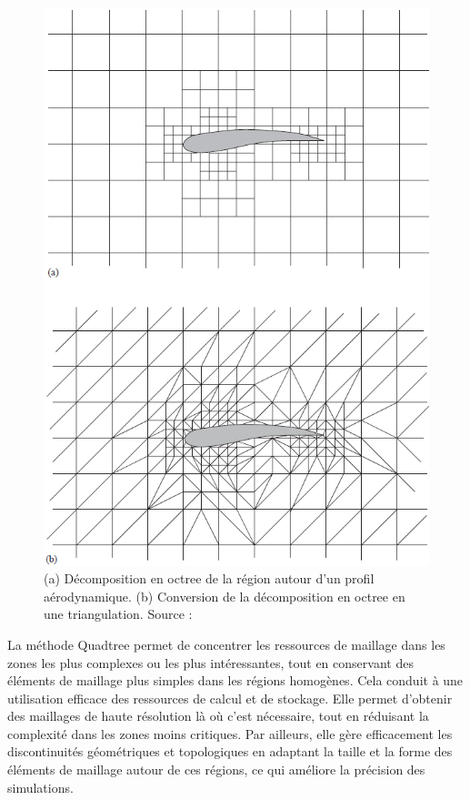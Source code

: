\begin{figure}[!h]
    \centering
    \includegraphics[scale=0.6]{images/octree decomposition.png}
    \caption{(a) Décomposition en octree de la région autour d'un profil aérodynamique. (b) Conversion de la décomposition en octree en une triangulation. Source : \cite{baker2005mesh}}
    \label{fig:octree decomposition}
\end{figure}

La méthode Quadtree permet de concentrer les ressources de maillage dans les zones les plus complexes ou les plus intéressantes, tout en conservant des éléments de maillage plus simples dans les régions homogènes. Cela conduit à une utilisation efficace des ressources de calcul et de stockage. Elle permet d'obtenir des maillages de haute résolution là où c'est nécessaire, tout en réduisant la complexité dans les zones moins critiques. Par ailleurs, elle gère efficacement les discontinuités géométriques et topologiques en adaptant la taille et la forme des éléments de maillage autour de ces régions, ce qui améliore la précision des simulations.

